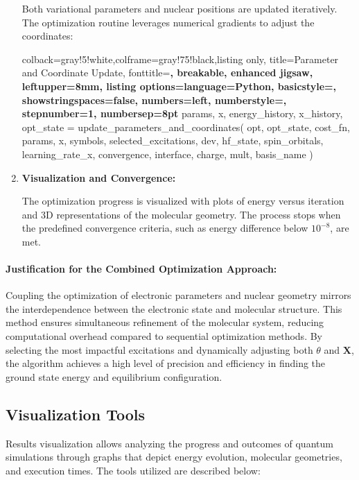 \begin{enumerate}
    Both variational parameters and nuclear positions are updated iteratively. The optimization routine leverages numerical gradients to adjust the coordinates:
    \begin{tcblisting}{colback=gray!5!white,colframe=gray!75!black,listing only,
      title=Parameter and Coordinate Update, fonttitle=\bfseries, breakable, enhanced jigsaw, leftupper=8mm,
      listing options={language=Python, basicstyle=\ttfamily\small,
      showstringspaces=false, numbers=left, numberstyle=\footnotesize, stepnumber=1, numbersep=8pt}}
params, x, energy_history, x_history, opt_state = update_parameters_and_coordinates(
    opt, opt_state, cost_fn, params, x, symbols, selected_excitations, dev, hf_state, spin_orbitals,
    learning_rate_x, convergence, interface, charge, mult, basis_name
)
    \end{tcblisting}

    \item \textbf{Visualization and Convergence:}
    
    The optimization progress is visualized with plots of energy versus iteration and 3D representations of the molecular geometry. The process stops when the predefined convergence criteria, such as energy difference below \(10^{-8}\), are met.
\end{enumerate}

\paragraph{Justification for the Combined Optimization Approach:}
Coupling the optimization of electronic parameters and nuclear geometry mirrors the interdependence between the electronic state and molecular structure. This method ensures simultaneous refinement of the molecular system, reducing computational overhead compared to sequential optimization methods. By selecting the most impactful excitations and dynamically adjusting both \(\theta\) and \(\mathbf{X}\), the algorithm achieves a high level of precision and efficiency in finding the ground state energy and equilibrium configuration.
\subsection{Visualization Tools}

Results visualization allows analyzing the progress and outcomes of quantum simulations through graphs that depict energy evolution, molecular geometries, and execution times. The tools utilized are described below:

